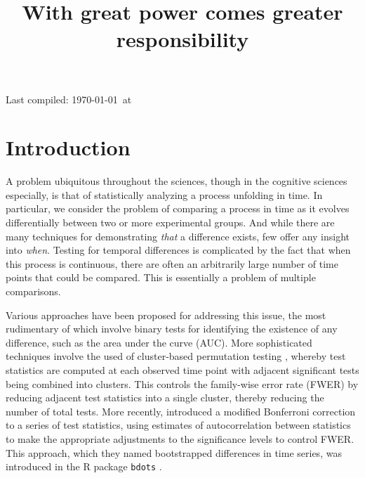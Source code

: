 \documentclass{article}
\title{With great power comes greater responsibility}
\date{}
\newcommand{\xt}{\texttt}
\begin{document}

\maketitle

Last compiled: \today \  at \currenttime


%


\section{Introduction}

A problem ubiquitous throughout the sciences, though in the cognitive sciences especially, is that of statistically analyzing a process unfolding in time. In particular, we consider the problem of comparing a process in time as it evolves differentially between two or more experimental groups. And while there are many techniques for demonstrating \textit{that} a difference exists, few offer any insight into \textit{when}. Testing for temporal differences is complicated by the fact that when this process is continuous, there are often an arbitrarily large number of time points that could be compared. This is essentially a problem of multiple comparisons.

Various approaches have been proposed for addressing this issue, the most rudimentary of which involve binary tests for identifying the existence of any difference, such as the area under the curve (AUC).  More sophisticated techniques involve the used of cluster-based permutation testing \citep{Maris2007}, whereby test statistics are computed at each observed time point with adjacent significant tests being combined into clusters. This controls the family-wise error rate (FWER) by reducing adjacent test statistics into a single cluster, thereby reducing the number of total tests. More recently, \citet{oleson2017detecting} introduced a modified Bonferroni correction to a series of test statistics, using estimates of autocorrelation between statistics to make the appropriate adjustments to the significance levels to control FWER. This approach, which they named bootstrapped differences in time series, was introduced in the R package \xt{bdots} \citep{seedorff2018bdots}.
\end{document}
